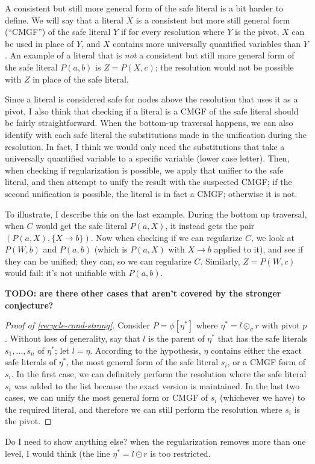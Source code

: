 \documentclass[12pt]{article}
\theoremstyle{definition}
\theoremstyle{remark}
\begin{document}
A consistent but still more general form of the safe literal is a bit harder to define. We will say that a literal $X$ is a consistent but more still general form (``CMGF'') of the safe literal $Y$ if for every resolution where $Y$ is the pivot, $X$ can be used in place of $Y$, and $X$ contains more universally quantified variables than $Y$. An example of a literal that is \emph{not} a consistent but still more general form of the safe literal $P(a,b)$ is $Z=P(X,c)$; the resolution would not be possible with $Z$ in place of the safe literal.

Since a literal is considered safe for nodes above the resolution that uses it as a pivot, I also think that checking if a literal is a CMGF of the safe literal should be fairly straightforward. When the bottom-up traversal happens, we can also identify with each safe literal the substitutions made in the unification during the resolution. In fact, I think we would only need the substitutions that take a universally quantified variable to a specific variable (lower case letter). Then, when checking if regularization is possible, we apply that unifier to the safe literal, and then attempt to unify the result with the suspected CMGF; if the second unification is possible, the literal is in fact a CMGF; otherwise it is not. 

To illustrate, I describe this on the last example. During the bottom up traversal, when $C$ would get the safe literal $P(a,X)$, it instead gets the pair $(P(a,X),\{X \rightarrow b\})$. Now when checking if we can regularize $C$, we look at $P(W,b)$ and $P(a,b)$ (which is $P(a,X)$ with $X \rightarrow b$ applied to it), and see if they can be unified; they can, so we can regularize $C$. Similarly, $Z=P(W,c)$ would fail: it's not unifiable with $P(a,b)$.


{\bf TODO: are there other cases that aren't covered by the stronger conjecture?}



\begin{proof}[Proof of \ref{recycle-cond-strong}]
Consider $P=\phi[\eta^*]$ where $\eta^* = l \odot_\sigma r$ with pivot $p$. Without loss of generality, say that $l$ is the parent of $\eta^*$ that has the safe literals $s_1,\ldots,s_n$ of $\eta^*$; let $l = \eta$. According to the hypothesis, $\eta$ contains either the exact safe literals of $\eta^*$, the most general form of the safe literal $s_i$, or a CMGF form of $s_i$. In the first case, we can definitely perform the resolution where the safe literal $s_i$ was added to the list because the exact version is maintained. In the last two cases, we can unify the most general form or CMGF of $s_i$ (whichever we have) to the required literal, and therefore we can still perform the resolution where $s_i$ is the pivot.
\end{proof}

Do I need to show anything else? when the regularization removes more than one level, I would think (the line $\eta^* = l \odot r$ is too restricted.
\end{document}

